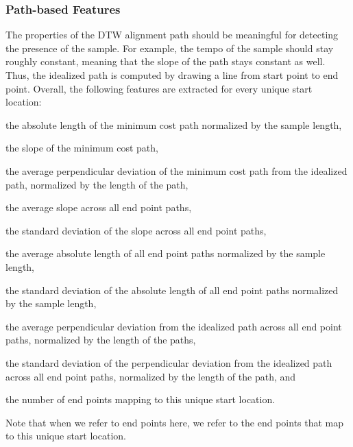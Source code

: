 \documentclass{article}
\begin{document}
\subsubsection{Path-based Features}
The properties of the DTW alignment path should be meaningful for detecting the presence of the sample.  For example, the tempo of the sample should stay roughly constant, meaning that the slope of the path stays constant as well. Thus, the idealized path is computed by drawing a line from start point to end point. 
Overall, the following features are extracted for every unique start location: 
\begin{inparaenum}[(i)]
    \item   the absolute length of the minimum cost path normalized by the sample length,
    \item   the slope of the minimum cost path, 
    \item   the average perpendicular deviation of the minimum cost path from the idealized path, normalized by the length of the path,
    \item   the average slope across all end point paths, 
		\item   the standard deviation of the slope across all end point paths, 
    \item   the average absolute length of all end point paths normalized by the sample length,
		\item   the standard deviation of the absolute length of all end point paths normalized by the sample length,
    \item   the average perpendicular deviation from the idealized path across all end point paths, normalized by the length of the paths,
    \item   the standard deviation of the perpendicular deviation from the idealized path across all end point paths, normalized by the length of the path, and
    \item   the number of end points mapping to this unique start location.
\end{inparaenum}
Note that when we refer to end points here, we refer to the end points that map to this unique start location.
\end{document}
